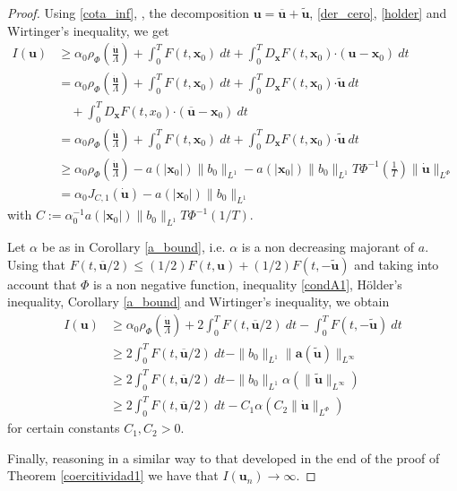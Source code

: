 \documentclass[twoside]{elsarticle}
\theoremstyle{remark}
\newcommand{\orlnor}{\|_{L^{\Phi}}}
\newcommand{\lphi}{L^{\Phi}}
\renewcommand{\b}[1]{\boldsymbol{#1}}
\newcommand{\ccdot}{\b{\cdot}}
\renewcommand{\leq}{\leqslant}
\begin{document}
\begin{proof}  Using \eqref{cota_inf}, \cite[Eq. (18), p.17]{mawhin2010critical},  the decomposition $\b{u}=\b{\overline{u}}+\b{\tilde{u}}$,  \eqref{der_cero}, \eqref{holder} and Wirtinger's inequality, we get
%
\begin{equation}\label{cota_con _upunto}
\begin{split}
I(\b{u})&\geq\alpha_0\rho_{\Phi}\left( \frac{\b{\dot{u}}}{\Lambda}\right)+\int_0^T F(t,\b{x}_0)\ dt 
+ \int_0^T D_{\b{x}} F (t,\b{x}_0) \ccdot (\b{u}-\b{x}_0)\ dt\\
&=\alpha_0\rho_{\Phi}\left( \frac{\b{\dot{u}}}{\Lambda}\right) +\int_0^T F(t,\b{x}_0)\ dt 
+ \int_0^TD_{\b{x}}F (t,\b{x}_0) \ccdot \b{\widetilde{u}} \ dt\\
&\quad + \int_0^T D_{\b{x}} F (t,x_0) \ccdot (\b{\overline{u}}  -\b{x}_0) \ dt\\
&=\alpha_0\rho_{\Phi}\left( \frac{\b{\dot{u}}}{\Lambda}\right)+\int_0^T F(t,\b{x}_0)\ dt + 
\int_0^T D_{\b{x}} F (t,\b{x}_0) \ccdot \b{\widetilde{u}}\ dt\\
&\geq\alpha_0 \rho_{\Phi}\left( \frac{\b{\dot{u}}}{\Lambda}\right)-a(|\b{x}_0|)\|b_0\|_{L^1} 
-a(|\b{x}_0|)\|b_0\|_{L^1}T\Phi^{-1}\left(\frac{1}{T}\right) \|\b{\dot{u}}  \|_{\lphi}\\
&= \alpha_0 J_{C,1}(\b{\dot{u}})-a(|\b{x}_0|)\|b_0\|_{L^1} 
\end{split}
\end{equation}
with $C:=\alpha_0^{-1}a(|\b{x}_0|)\|b_0\|_{L^1}T\Phi^{-1}(1/T)$. 

Let $\alpha$ be as in Corollary \ref{a_bound}, i.e. $\alpha$ is  a non decreasing majorant of $a$. Using that  $F(t, \b{\overline{u}} /2) \leq (1/2)F(t,\b{u}) + (1/2) F(t, -\b{\widetilde{u}})$ and taking into account that $\Phi$ is a non negative function, inequality \eqref{condA1}, H\"older's inequality,  Corollary \ref{a_bound} and Wirtinger's inequality, we obtain
\begin{equation}\label{cota_con _ubarra}
\begin{split}
I(\b{u}) &\geq\alpha_0\rho_{\Phi}\left( \frac{\b{\dot{u}}}{\Lambda}\right)  +2 \int_0^T F(t,\b{\overline{u}} /2)\ dt - \int_0^T F(t, -\b{\widetilde{u}})\ dt\\
&\geq 2 \int_0^T F(t,\b{\overline{u}} /2)\ dt -\|b_0\|_{L^1} \|\b{a}(\b{\tilde{u}})\|_{L^{\infty}}\\
&\geq 2 \int_0^T F(t,\b{\overline{u}} /2)\ dt -\|b_0\|_{L^1} \alpha(\|\b{\tilde{u}}\|_{L^{\infty}})\\
&\geq 2 \int_0^T F(t,\b{\overline{u}} /2)\  dt - C_1 \alpha(C_2\|\b{\dot{u}}\orlnor)
\end{split}
\end{equation}
for certain constants $C_1,C_2>0$.


Finally, reasoning  
in a similar way to that developed in the end of  the proof of Theorem \ref{coercitividad1} we have that $I(\b{u}_n)\to\infty$. 
\end{proof}
\end{document}

